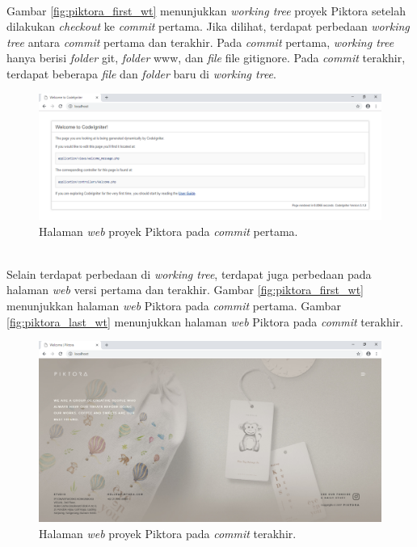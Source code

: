\ \\
Gambar \ref{fig:piktora_first_wt} menunjukkan \textit{working tree} proyek Piktora setelah dilakukan \textit{checkout} ke  \textit{commit} pertama. Jika dilihat, terdapat perbedaan \textit{working tree} antara \textit{commit} pertama dan terakhir. Pada \textit{commit} pertama, \textit{working tree} hanya berisi \textit{folder} git, \textit{folder} www, dan \textit{file} file gitignore.  Pada \textit{commit} terakhir, terdapat beberapa \textit{file} dan \textit{folder} baru di \textit{working tree}. 
 
\begin{figure}[H]
	\centering
		\includegraphics[scale=0.5]{Gambar/piktora_versi_pertama.png}
	\caption{Halaman \textit{web} proyek Piktora pada \textit{commit} pertama.}
	\label{fig:piktora_web_first}
\end{figure} 
\ \\
Selain terdapat perbedaan di \textit{working tree}, terdapat juga perbedaan pada halaman \textit{web} versi pertama dan terakhir. Gambar \ref{fig:piktora_first_wt} menunjukkan halaman \textit{web} Piktora pada \textit{commit} pertama. Gambar \ref{fig:piktora_last_wt} menunjukkan halaman \textit{web} Piktora pada \textit{commit} terakhir.
\begin{figure}[H]
	\centering
		\includegraphics[scale=0.5]{Gambar/piktora_versi_terakhir.png}
	\caption{Halaman \textit{web} proyek Piktora pada \textit{commit} terakhir.}
	\label{fig:piktora_web_last}
\end{figure} 


